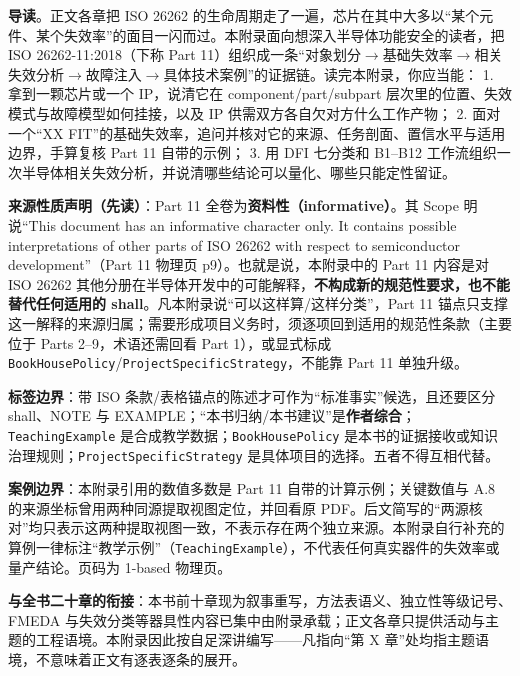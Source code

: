 \begin{noteblock}
\textbf{导读}。正文各章把 ISO 26262 的生命周期走了一遍，芯片在其中大多以“某个元件、某个失效率”的面目一闪而过。本附录面向想深入半导体功能安全的读者，把 ISO 26262-11:2018（下称 Part 11）组织成一条“对象划分\(\rightarrow\)基础失效率\(\rightarrow\)相关失效分析\(\rightarrow\)故障注入\(\rightarrow\)具体技术案例”的证据链。读完本附录，你应当能：
1. 拿到一颗芯片或一个 IP，说清它在 component/part/subpart 层次里的位置、失效模式与故障模型如何挂接，以及 IP 供需双方各自欠对方什么工作产物；
2. 面对一个“XX FIT”的基础失效率，追问并核对它的来源、任务剖面、置信水平与适用边界，手算复核 Part 11 自带的示例；
3. 用 DFI 七分类和 B1–B12 工作流组织一次半导体相关失效分析，并说清哪些结论可以量化、哪些只能定性留证。

\textbf{来源性质声明（先读）}：Part 11 全卷为\textbf{资料性（informative）}。其 Scope 明说“This document has an informative character only. It contains possible interpretations of other parts of ISO 26262 with respect to semiconductor development”（Part 11 物理页 p9）。也就是说，本附录中的 Part 11 内容是对 ISO 26262 其他分册在半导体开发中的可能解释，\textbf{不构成新的规范性要求，也不能替代任何适用的 shall}。凡本附录说“可以这样算/这样分类”，Part 11 锚点只支撑这一解释的来源归属；需要形成项目义务时，须逐项回到适用的规范性条款（主要位于 Parts 2–9，术语还需回看 Part 1），或显式标成 \nolinkurl{BookHousePolicy}/\nolinkurl{ProjectSpecificStrategy}，不能靠 Part 11 单独升级。

\textbf{标签边界}：带 ISO 条款/表格锚点的陈述才可作为“标准事实”候选，且还要区分 shall、NOTE 与 EXAMPLE；“本书归纳/本书建议”是\textbf{作者综合}；\nolinkurl{TeachingExample} 是合成教学数据；\nolinkurl{BookHousePolicy} 是本书的证据接收或知识治理规则；\nolinkurl{ProjectSpecificStrategy} 是具体项目的选择。五者不得互相代替。

\textbf{案例边界}：本附录引用的数值多数是 Part 11 自带的计算示例；关键数值与 A.8 的来源坐标曾用两种同源提取视图定位，并回看原 PDF。后文简写的“两源核对”均只表示这两种提取视图一致，不表示存在两个独立来源。本附录自行补充的算例一律标注“教学示例”（\nolinkurl{TeachingExample}），不代表任何真实器件的失效率或量产结论。页码为 1-based 物理页。

\textbf{与全书二十章的衔接}：本书前十章现为叙事重写，方法表语义、独立性等级记号、FMEDA 与失效分类等器具性内容已集中由附录承载；正文各章只提供活动与主题的工程语境。本附录因此按自足深讲编写——凡指向“第 X 章”处均指主题语境，不意味着正文有逐表逐条的展开。
\end{noteblock}


